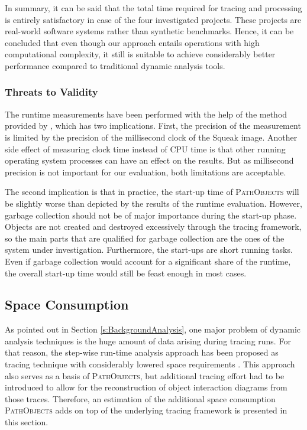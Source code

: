 In summary, it can be said that the total time required for tracing and processing is entirely satisfactory in case of the four investigated projects.
These projects are real-world software systems rather than synthetic benchmarks.
Hence, it can be concluded that even though our approach entails operations with high computational complexity, it still is suitable to achieve considerably better performance compared to traditional dynamic analysis tools.

\subsubsection{Threats to Validity}
The runtime measurements have been performed with the help of the  method provided by , which has two implications.
First, the precision of the measurement is limited by the precision of the millisecond clock of the Squeak image.
Another side effect of measuring clock time instead of CPU time is that other running operating system processes can have an effect on the results.
But as millisecond precision is not important for our evaluation, both limitations are acceptable.

The second implication is that in practice, the start-up time of \textsc{PathObjects} will be slightly worse than depicted by the results of the runtime evaluation.
However, garbage collection should not be of major importance during the start-up phase.
Objects are not created and destroyed excessively through the tracing framework, so the main parts that are qualified for garbage collection are the ones of the system under investigation.
Furthermore, the start-ups are short running tasks.
Even if garbage collection would account for a significant share of the runtime, the overall start-up time would still be feast enough in most cases.

\subsection{Space Consumption}
\label{ss:DiscussionSpace}
As pointed out in Section \ref{s:BackgroundAnalysis}, one major problem of dynamic analysis techniques is the huge amount of data arising during tracing runs.
For that reason, the step-wise run-time analysis approach has been proposed as tracing technique with considerably lowered space requirements \cite{perscheid_immediacy_2010}. 
This approach also serves as a basis of \textsc{PathObjects}, but additional tracing effort had to be introduced to allow for the reconstruction of object interaction diagrams from those traces.
Therefore, an estimation of the additional space consumption \textsc{PathObjects} adds on top of the underlying tracing framework is presented in this section.

